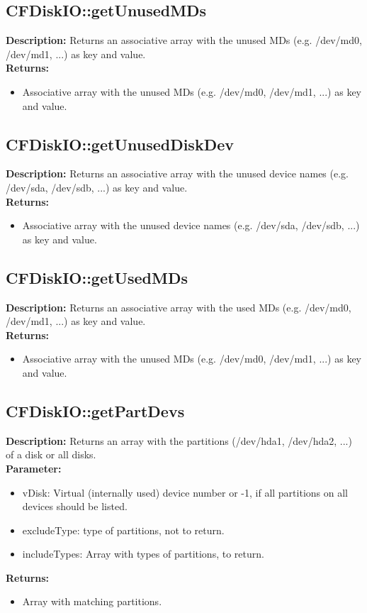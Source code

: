 \subsection{CFDiskIO::getUnusedMDs}
\textbf{Description:} Returns an associative array with the unused MDs (e.g. /dev/md0, /dev/md1, ...) as key and value.\\
\textbf{Returns:}
\begin{itemize}
\item Associative array with the unused MDs (e.g. /dev/md0, /dev/md1, ...) as key and value.
\end{itemize}

\subsection{CFDiskIO::getUnusedDiskDev}
\textbf{Description:} Returns an associative array with the unused device names (e.g. /dev/sda, /dev/sdb, ...) as key and value.\\
\textbf{Returns:}
\begin{itemize}
\item Associative array with the unused device names (e.g. /dev/sda, /dev/sdb, ...) as key and value.
\end{itemize}

\subsection{CFDiskIO::getUsedMDs}
\textbf{Description:} Returns an associative array with the used MDs (e.g. /dev/md0, /dev/md1, ...) as key and value.\\
\textbf{Returns:}
\begin{itemize}
\item Associative array with the unused MDs (e.g. /dev/md0, /dev/md1, ...) as key and value.
\end{itemize}

\subsection{CFDiskIO::getPartDevs}
\textbf{Description:} Returns an array with the partitions (/dev/hda1, /dev/hda2, ...) of a disk or all disks.\\
\textbf{Parameter:}
\begin{itemize}
\item vDisk: Virtual (internally used) device number or -1, if all partitions on all devices should be listed.
\item excludeType: type of partitions, not to return.
\item includeTypes: Array with types of partitions, to return.
\end{itemize}
\textbf{Returns:}
\begin{itemize}
\item Array with matching partitions.
\end{itemize}


